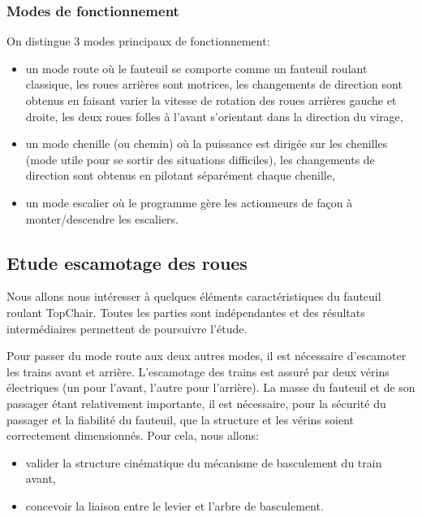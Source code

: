 \subsubsection{Modes de fonctionnement}

On distingue 3 modes principaux de fonctionnement:
\begin{itemize}
 \item un mode \og route \fg{} où le fauteuil se comporte comme un fauteuil roulant classique, les roues arrières sont motrices, les changements de direction sont obtenus en faisant varier la vitesse de rotation des roues arrières gauche et droite, les deux roues folles à l'avant s'orientant dans la direction du virage,
 \item un mode \og chenille \fg{} (ou chemin) où la puissance est dirigée sur les chenilles (mode utile pour se sortir des situations difficiles), les changements de direction sont obtenus en pilotant séparément chaque chenille,
 \item un mode \og escalier \fg{} où le programme gère les actionneurs de façon à monter/descendre les escaliers.
\end{itemize}

\subsection{Etude escamotage des roues}

Nous allons nous intéresser à quelques éléments caractéristiques du fauteuil roulant TopChair\textregistered{}. Toutes les parties sont indépendantes et des résultats intermédiaires permettent de poursuivre l'étude.

Pour passer du mode \og route \fg{} aux deux autres modes, il est nécessaire d'escamoter les trains avant et arrière. L'escamotage des trains est assuré par deux vérins électriques (un pour l'avant, l'autre pour l'arrière). La masse du fauteuil et de son passager étant relativement importante, il est nécessaire, pour la sécurité du passager et la fiabilité du fauteuil, que la structure et les vérins soient correctement dimensionnés. Pour cela, nous allons:
\begin{itemize}
 \item valider la structure cinématique du mécanisme de basculement du train avant,
 \item concevoir la liaison entre le levier et l'arbre de basculement.
\end{itemize}

~\

